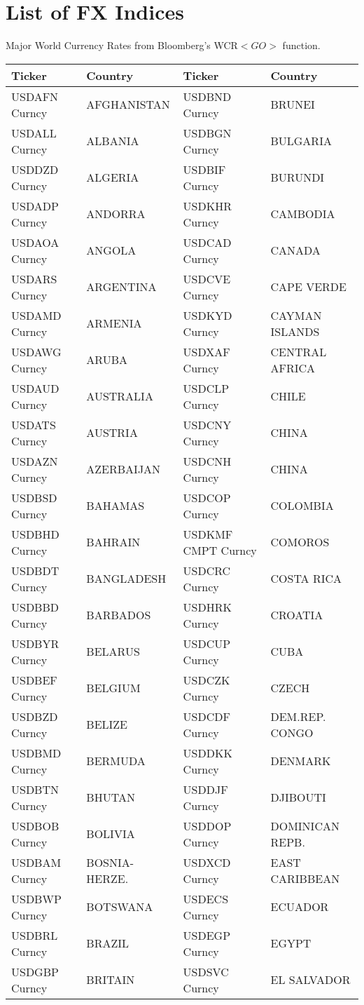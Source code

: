 \chapter{List of FX Indices}\label{sec.D} 
Major World Currency Rates from Bloomberg's WCR$<GO>$ function\cite{bloomberg}.

\begin {table}[H]
\begin{center}
\small
\begin{tabu}{| l l || l l |} 
\hline
Ticker & Country & Ticker & Country \\
\hline
USDAFN Curncy & AFGHANISTAN & USDBND Curncy & BRUNEI \\ 
USDALL Curncy & ALBANIA & USDBGN Curncy & BULGARIA \\ 
USDDZD Curncy & ALGERIA & USDBIF Curncy & BURUNDI \\ 
USDADP Curncy & ANDORRA & USDKHR Curncy & CAMBODIA \\ 
USDAOA Curncy & ANGOLA & USDCAD Curncy & CANADA \\ 
USDARS Curncy & ARGENTINA & USDCVE Curncy & CAPE VERDE \\ 
USDAMD Curncy & ARMENIA & USDKYD Curncy & CAYMAN ISLANDS \\ 
USDAWG Curncy & ARUBA & USDXAF Curncy & CENTRAL AFRICA \\ 
USDAUD Curncy & AUSTRALIA & USDCLP Curncy & CHILE \\ 
USDATS Curncy & AUSTRIA & USDCNY Curncy & CHINA \\ 
USDAZN Curncy & AZERBAIJAN & USDCNH Curncy & CHINA \\ 
USDBSD Curncy & BAHAMAS & USDCOP Curncy & COLOMBIA \\ 
USDBHD Curncy & BAHRAIN & USDKMF CMPT Curncy & COMOROS \\ 
USDBDT Curncy & BANGLADESH & USDCRC Curncy & COSTA RICA \\ 
USDBBD Curncy & BARBADOS & USDHRK Curncy & CROATIA \\ 
USDBYR Curncy & BELARUS & USDCUP Curncy & CUBA \\ 
USDBEF Curncy & BELGIUM & USDCZK Curncy & CZECH \\ 
USDBZD Curncy & BELIZE & USDCDF Curncy & DEM.REP. CONGO \\ 
USDBMD Curncy & BERMUDA & USDDKK Curncy & DENMARK \\ 
USDBTN Curncy & BHUTAN & USDDJF Curncy & DJIBOUTI \\ 
USDBOB Curncy & BOLIVIA & USDDOP Curncy & DOMINICAN REPB. \\ 
USDBAM Curncy & BOSNIA-HERZE. & USDXCD Curncy & EAST CARIBBEAN \\ 
USDBWP Curncy & BOTSWANA & USDECS Curncy & ECUADOR \\ 
USDBRL Curncy & BRAZIL & USDEGP Curncy & EGYPT \\ 
USDGBP Curncy & BRITAIN & USDSVC Curncy & EL SALVADOR \\ 

\hline
\end{tabu}
\small
\end{center}
\end{table}

